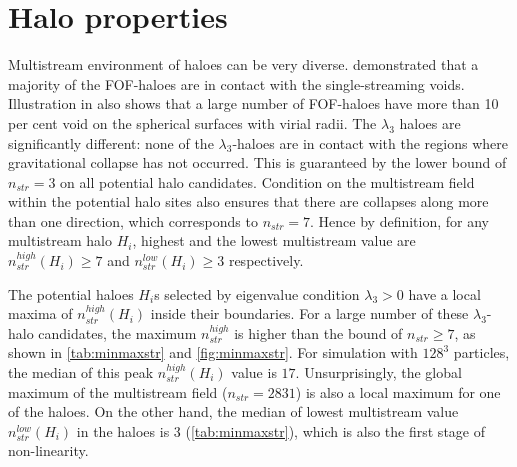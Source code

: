 \section{Halo properties}
\label{sub:HaloProperties}

Multistream environment of haloes can be very diverse. \cite{Ramachandra2015} demonstrated that a majority of the FOF-haloes are in contact with the single-streaming voids. Illustration in \cite{Ramachandra2017} also shows that a large number of FOF-haloes have more than 10 per cent void on the spherical surfaces with virial radii. The $\lambda_3$ haloes are significantly different: none of the $\lambda_3$-haloes are in contact with the regions where gravitational collapse has not occurred. This is guaranteed by the lower bound of $n_{str} = 3$ on all potential halo candidates. Condition on the multistream field within the potential halo sites also ensures that there are collapses along more than one direction, which corresponds to $n_{str} = 7$. Hence by definition, for any multistream halo $H_i$, highest and the lowest multistream value are $n_{str}^{high}(H_i) \geq 7$ and $n_{str}^{low}(H_i) \geq 3$ respectively. 





The potential haloes $H_i$s selected by eigenvalue condition $\lambda_3 > 0$ have a local maxima of $n_{str}^{high}(H_i)$ inside their boundaries. For a large number of these $\lambda_3$-halo candidates, the maximum $n_{str}^{high}$ is higher than the bound of $n_{str} \geq 7$, as shown in \autoref{tab:minmaxstr} and \autoref{fig:minmaxstr}. For simulation with $128^3$ particles, the median of this peak $n_{str}^{high}(H_i)$ value is $17$. Unsurprisingly, the global maximum of the multistream field ($n_{str} = 2831$) is also a local maximum for one of the haloes. On the other hand, the median of lowest multistream value $n_{str}^{low}(H_i)$ in the haloes is 3 (\autoref{tab:minmaxstr}), which is also the first stage of non-linearity. 



